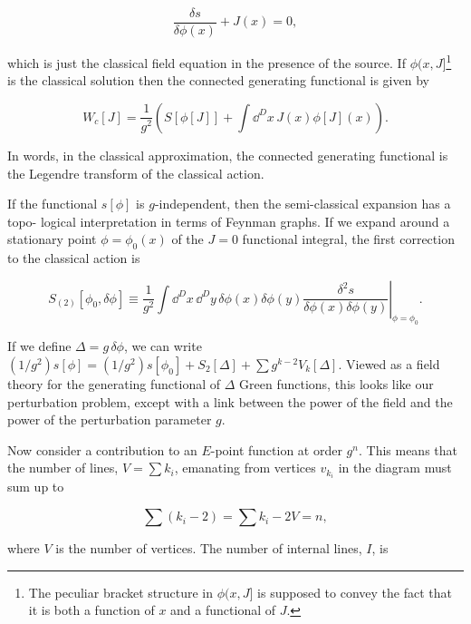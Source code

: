 \begin{equation}
\frac{\delta s}{\delta\phi(x)}+J(x)=0,
\label{eq:3.29}
\end{equation}

which is just the classical field equation in the presence of the source. If $\phi(x,J]$\footnote[9]{The peculiar bracket structure in $\phi(x,J]$ is supposed to convey the fact that it is both a function of $x$ and a functional of $J$.} is the
classical solution then the connected generating functional is given by

\begin{equation}
W_c[J]=\frac{1}{g^2}\left(S[\phi[J]]+\int\dd^D x\,J(x)\phi[J](x)\right).
\label{eq:3.30}
\end{equation}

In words, in the classical approximation, the connected generating functional is the
Legendre transform of the classical action.

If the functional $s[\phi]$ is $g$-independent, then the semi-classical expansion has a topo-
logical interpretation in terms of Feynman graphs. If we expand around a stationary
point $\phi=\phi_0(x)$ of the $J=0$ functional integral, the first correction to the classical
action is

\begin{equation}
S_{(2)}[\phi_0,\delta\phi]\equiv\frac{1}{g^2}\int\dd^D x\,\dd^D y\,\delta\phi(x)\delta\phi(y)\left.\frac{\delta^2s}{\delta\phi(x)\delta\phi(y)}\right|_{\phi=\phi_0}.
\label{eq:3.31}
\end{equation}

If we define $\Delta=g\,\delta\phi$, we can write $(1/g^2)s[\phi]=(1/g^2)s[\phi_0]+S_2[\Delta]+\sum g^{k-2}V_k[\Delta]$.
Viewed as a field theory for the generating functional of $\Delta$ Green functions, this looks
like our perturbation problem, except with a link between the power of the field and
the power of the perturbation parameter $g$.

Now consider a contribution to an $E$-point function at order $g^n$. This means that the
number of lines, $V=\sum k_i$, emanating from vertices $v_{k_i}$ in the diagram must sum up to

\[
\sum(k_i-2)=\sum k_i-2V=n,
\]

where $V$ is the number of vertices. The number of internal lines, $I$, is

